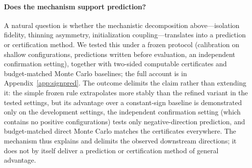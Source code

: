 
\paragraph{Does the mechanism support prediction?}
A natural question is whether the mechanistic decomposition
above---isolation fidelity, thinning asymmetry, initialization
coupling---translates into a prediction or certification method.
We tested this under a frozen protocol (calibration on shallow
configurations, predictions written before evaluation, an
independent confirmation setting), together with two-sided
computable certificates and budget-matched Monte Carlo baselines;
the full account is in Appendix~\ref{app:signpred}. The outcome
delimits the claim rather than extending it: the simple frozen
rule extrapolates more stably than the refined variant in the
tested settings, but its advantage over a constant-sign baseline
is demonstrated only on the development settings, the independent
confirmation setting (which contains no positive configurations)
tests only negative-direction prediction, and budget-matched
direct Monte Carlo matches the certificates everywhere. The
mechanism thus explains and delimits the observed downstream
directions; it does not by itself deliver a prediction or
certification method of general advantage.
